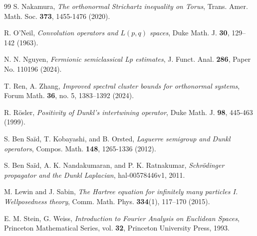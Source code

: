 \documentclass[a4paper,11pt, reqno]{amsart}
\numberwithin{equation}{section}
\theoremstyle{plain}
\theoremstyle{definition}
\theoremstyle{remark}
\begin{document}
\begin{thebibliography}{99}
\label{nakamura} S. Nakamura, \emph{The orthonormal Strichartz inequality on Torus}, Trans. Amer. Math. Soc. \textbf{373}, 1455-1476 (2020).

\label{Neil} R. O'Neil, \emph{Convolution operators and $L(p,q)$ spaces}, Duke Math. J. \textbf{30}, 129–142 (1963).
 
\label{Nguyen} N. N. Nguyen, \emph{Fermionic semiclassical Lp estimates}, J. Funct. Anal. \textbf{286}, Paper No. 110196 (2024).


 T. Ren, A. Zhang, \emph{Improved spectral cluster bounds for orthonormal systems}, Forum Math. \textbf{36}, no. 5, 1383–1392 (2024).

R. R\"{o}sler, \emph{Positivity of Dunkl's intertwining operator},  Duke Math. J. \textbf{98}, 445-463 (1999). 

		
S. Ben Sa\"id, T. Kobayashi, and B. Orsted, \emph{Laguerre semigroup and Dunkl operators}, Compos. Math. \textbf{148}, 1265-1336 (2012). 
		
  S. Ben Sa\"id, A. K. Nandakumaran, and  P. K. Ratnakumar, \emph{Schr\"odinger propagator and the Dunkl Laplacian}, hal-00578446v1, 2011.

M. Lewin and J. Sabin, \emph{The Hartree equation for infinitely many particles I. Wellposedness theory}, Comm. Math. Phys. \textbf{334}(1), 117–170 (2015).



  E. M. Stein, G. Weiss, \emph{Introduction to Fourier Analysis on Euclidean Spaces}, Princeton Mathematical Series, vol. \textbf{32}, Princeton University Press, 1993.


\end{thebibliography}
\end{document}
